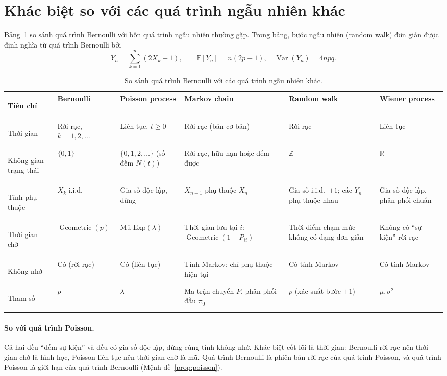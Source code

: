 \documentclass[12pt,a4paper]{article}
\theoremstyle{definition}
\theoremstyle{remark}
\newcommand{\E}{\mathbb{E}}
\newcommand{\Var}{\operatorname{Var}}
\newcommand{\Geo}{\operatorname{Geometric}}
\begin{document}
\section{Khác biệt so với các quá trình ngẫu nhiên khác}\label{sec:compare}

Bảng~\ref{tab:compare} so sánh quá trình Bernoulli với bốn quá trình ngẫu nhiên thường gặp. Trong bảng,
bước ngẫu nhiên (random walk) đơn giản được định nghĩa từ quá trình Bernoulli bởi
\begin{equation}\label{eq:rw}
  Y_n = \sum_{k=1}^n (2X_k - 1), \qquad \E[Y_n] = n(2p-1),\quad \Var(Y_n) = 4npq.
\end{equation}

\begin{table}[ht]
\centering
\caption{So sánh quá trình Bernoulli với các quá trình ngẫu nhiên khác.}
\label{tab:compare}
\small
\renewcommand{\arraystretch}{1.3}
\begin{tabularx}{\textwidth}{>{\bfseries\raggedright}p{2.1cm}
  >{\raggedright}X >{\raggedright}X >{\raggedright}X >{\raggedright}X >{\raggedright\arraybackslash}X}
\toprule
Tiêu chí & Bernoulli & Poisson process & Markov chain & Random walk & Wiener process \\
\midrule
Thời gian & Rời rạc, $k=1,2,\dots$ & Liên tục, $t\ge0$ & Rời rạc (bản cơ bản) & Rời rạc & Liên tục \\
Không gian trạng thái & $\{0,1\}$ & $\{0,1,2,\dots\}$ (số đếm $N(t)$) & Rời rạc, hữu hạn hoặc đếm được
  & $\mathbb Z$ & $\mathbb R$ \\
Tính phụ thuộc & $X_k$ i.i.d. & Gia số độc lập, dừng & $X_{n+1}$ phụ thuộc $X_n$
  & Gia số i.i.d.\ $\pm1$; các $Y_n$ phụ thuộc nhau & Gia số độc lập, phân phối chuẩn \\
Thời gian chờ & $\Geo(p)$ & Mũ $\mathrm{Exp}(\lambda)$ & Thời gian lưu tại $i$: $\Geo(1-P_{ii})$
  & Thời điểm chạm mức – không có dạng đơn giản & Không có ``sự kiện'' rời rạc \\
Không nhớ & Có (rời rạc) & Có (liên tục) & Tính Markov: chỉ phụ thuộc hiện tại & Có tính Markov
  & Có tính Markov \\
Tham số & $p$ & $\lambda$ & Ma trận chuyển $P$, phân phối đầu $\pi_0$ & $p$ (xác suất bước $+1$)
  & $\mu,\sigma^2$ \\
\bottomrule
\end{tabularx}
\end{table}

\paragraph{So với quá trình Poisson.} Cả hai đều ``đếm sự kiện'' và đều có gia số độc lập, dừng cùng tính không
nhớ. Khác biệt cốt lõi là thời gian: Bernoulli rời rạc nên thời gian chờ là hình học, Poisson liên tục nên thời
gian chờ là mũ. Quá trình Bernoulli là phiên bản rời rạc của quá trình Poisson, và quá trình Poisson là giới hạn
của quá trình Bernoulli (Mệnh đề~\ref{prop:poisson}).
\end{document}
